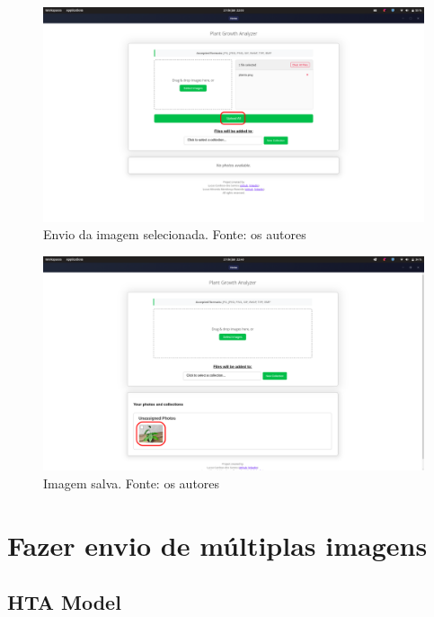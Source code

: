 \begin{figure}[H]
    \centering
    \includegraphics[width=1\textwidth]{../figures/screens/uc001/Screenshot from 2025-06-27 22-03-05.png}
    \caption{Envio da imagem selecionada. Fonte: os autores}
    \label{fig:uc001-screen3}
\end{figure}

\begin{figure}[H]
    \centering
    \includegraphics[width=1\textwidth]{../figures/screens/uc001/Screenshot from 2025-06-27 22-03-20.png}
    \caption{Imagem salva. Fonte: os autores}
    \label{fig:uc001-screen4}
\end{figure}

\section{Fazer envio de múltiplas imagens}

\subsection{HTA Model}


